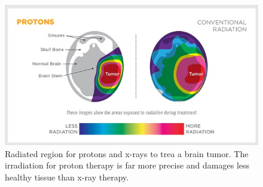 \begin{figure}
  \centering
  \includegraphics[height=0.5\textwidth]{images/risk.png}
  \caption{Radiated region for protons and x-rays to trea a brain tumor. The irradiation for proton therapy is far more precise and damages less healthy tissue than
  x-ray therapy.}
  \label{fig:risk}
\end{figure}



